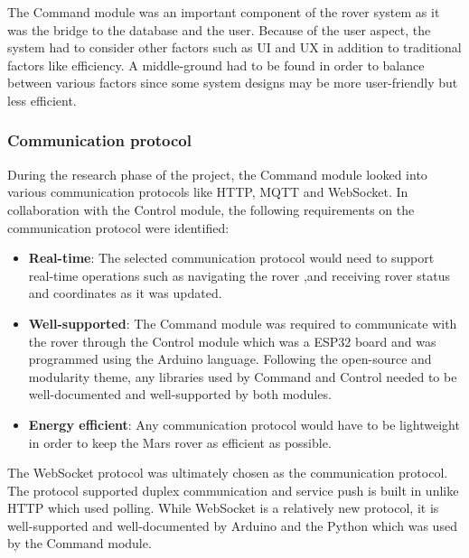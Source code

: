 \documentclass[11pt, a4paper]{article}
\begin{document}
The Command module was an important component of the rover system as it was the bridge to the database and the user. Because of the user aspect, the system had to consider other factors such as UI and UX in addition to traditional factors like efficiency. A middle-ground had to be found in order to balance between various factors since some system designs may be more user-friendly but less efficient. 

\subsubsection{Communication protocol}

During the research phase of the project, the Command module looked into various communication protocols like HTTP, MQTT and WebSocket. In collaboration with the Control module, the following requirements on the communication protocol were identified:
\begin{itemize}
    \item \textbf{Real-time}: The selected communication protocol would need to support real-time operations such as navigating the rover ,and receiving rover status and coordinates as it was updated. 
      
    \item \textbf{Well-supported}: The Command module was required to communicate with the rover through the Control module which was a ESP32 board and was programmed using the Arduino language. Following the open-source and modularity theme, any libraries used by Command and Control needed to be well-documented and well-supported by both modules. 
    
    \item \textbf{Energy efficient}: Any communication protocol would have to be lightweight in order to keep the Mars rover as efficient as possible.
\end{itemize} 

The WebSocket protocol was ultimately chosen as the communication protocol. The protocol supported duplex communication and service push is built in unlike HTTP which used polling. While WebSocket is a relatively new protocol, it is well-supported and well-documented by Arduino and the Python which was used by the Command module. 
\end{document}
